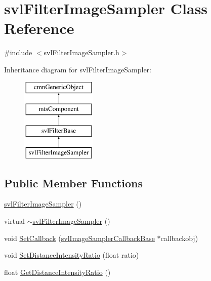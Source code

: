 \hypertarget{classsvl_filter_image_sampler}{}\section{svl\+Filter\+Image\+Sampler Class Reference}
\label{classsvl_filter_image_sampler}


{\ttfamily \#include $<$svl\+Filter\+Image\+Sampler.\+h$>$}

Inheritance diagram for svl\+Filter\+Image\+Sampler\+:\begin{figure}[H]
\begin{center}
\leavevmode
\includegraphics[height=4.000000cm]{d0/db0/classsvl_filter_image_sampler}
\end{center}
\end{figure}
\subsection*{Public Member Functions}
\begin{DoxyCompactItemize}
\item 
\hyperlink{classsvl_filter_image_sampler_a4528022d91fa83c09b309b0a68eb6419}{svl\+Filter\+Image\+Sampler} ()
\item 
virtual \hyperlink{classsvl_filter_image_sampler_aa8950af662941ab7c17b909ed78a51fa}{$\sim$svl\+Filter\+Image\+Sampler} ()
\item 
void \hyperlink{classsvl_filter_image_sampler_a9f2a0959d994311d9238ebf13bedd923}{Set\+Callback} (\hyperlink{classsvl_image_sampler_callback_base}{svl\+Image\+Sampler\+Callback\+Base} $\ast$callbackobj)
\item 
void \hyperlink{classsvl_filter_image_sampler_a9b3d4f5197e111d9d4c4b6e6f497212c}{Set\+Distance\+Intensity\+Ratio} (float ratio)
\item 
float \hyperlink{classsvl_filter_image_sampler_a1200847f560dac60f26c72d3fac9ac50}{Get\+Distance\+Intensity\+Ratio} ()
\end{DoxyCompactItemize}
